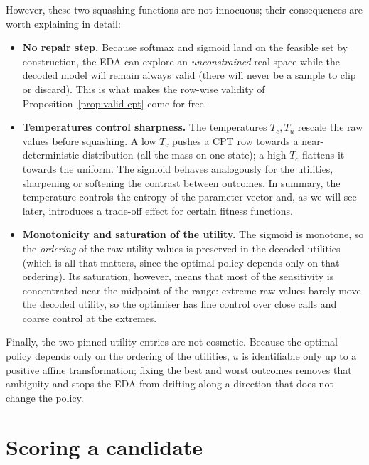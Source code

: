 However, these two squashing functions are not innocuous; their consequences are
worth explaining in detail:

\begin{itemize}
  \item \textbf{No repair step.} Because softmax and sigmoid land on the
        feasible set by construction, the EDA can explore an
        \emph{unconstrained} real space while the decoded model will remain always
        valid (there will never be a sample to clip or discard).
        This is what makes the row-wise validity of
        Proposition~\ref{prop:valid-cpt} come for free.
  \item \textbf{Temperatures control sharpness.} The temperatures
        $T_c, T_u$ rescale the raw values before squashing. A low $T_c$
        pushes a CPT row towards a near-deterministic distribution (all
        the mass on one state); a high $T_c$ flattens it towards the
        uniform. The sigmoid behaves analogously for the utilities,
        sharpening or softening the contrast between outcomes. In summary, the temperature controls the entropy of the parameter vector and, as we will see later, introduces a trade-off effect for certain fitness functions.
        
  \item \textbf{Monotonicity and saturation of the utility.} The sigmoid
        is monotone, so the \emph{ordering} of the raw utility values
        is preserved in the decoded utilities (which is all that
        matters, since the optimal policy depends only on that ordering).
        Its saturation, however, means that most of the sensitivity is
        concentrated near the midpoint of the range: extreme raw values
        barely move the decoded utility, so the optimiser has fine
        control over close calls and coarse control at the extremes.
\end{itemize}

Finally, the two pinned utility entries are not cosmetic. Because the
optimal policy depends only on the ordering of the utilities, $u$ is
identifiable only up to a positive affine transformation; fixing the
best and worst outcomes removes that ambiguity and stops the EDA from
drifting along a direction that does not change the policy. 

\section{Scoring a candidate}

